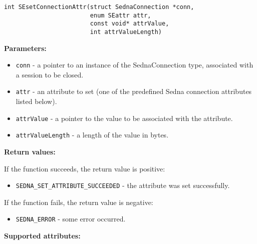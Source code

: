 \documentclass[a4paper,12pt]{article}
\newenvironment{citemize}
{\begin{itemize}
  \setlength{\itemsep}{0pt}
  \setlength{\parskip}{0pt}
  \setlength{\parsep}{0pt}}
{\end{itemize}}
\begin{document}
\begin{verbatim}
int SEsetConnectionAttr(struct SednaConnection *conn,
                        enum SEattr attr,
                        const void* attrValue,
                        int attrValueLength)
\end{verbatim}

\noindent
\textbf{Parameters:}

\begin{citemize}
\item\verb!conn! - a pointer to an instance of the SednaConnection type,
associated with a session to be closed.
\item\verb!attr! - an attribute to set (one of the predefined Sedna connection
attributes listed below).
\item\verb!attrValue! - a pointer to the value to be associated with the
attribute.
\item\verb!attrValueLength! - a length of the value in bytes.
\end{citemize}

\noindent
\textbf{Return values:}

\medskip

\noindent
If the function succeeds, the return value is positive:

\begin{citemize}
\item\verb!SEDNA_SET_ATTRIBUTE_SUCCEEDED! - the attribute was set successfully.
\end{citemize}

\noindent
If the function fails, the return value is negative:

\begin{citemize}
\item\verb!SEDNA_ERROR! - some error occurred.
\end{citemize}

\medskip

\noindent
\textbf{Supported attributes:}
\end{document}
